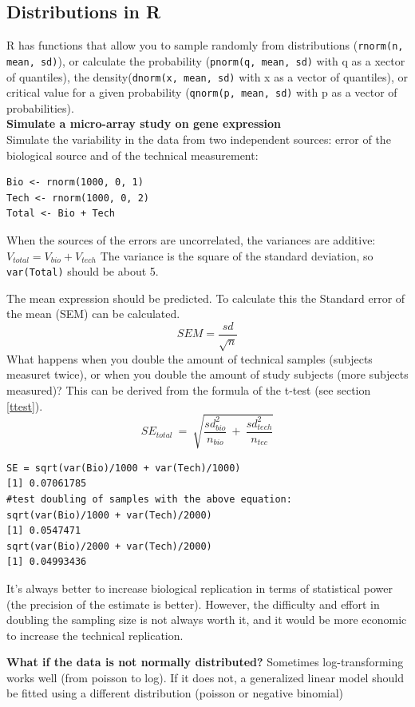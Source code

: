 \documentclass{article}
\begin{document}
\subsection{Distributions in R}
R has functions that allow you to sample randomly from distributions (\texttt{rnorm(n, mean, sd)}), or calculate the probability (\texttt{pnorm(q, mean, sd)} with q as a xector of quantiles), the density(\texttt{dnorm(x, mean, sd)} with x as a vector of quantiles), or critical value for a given probability (\texttt{qnorm(p, mean, sd)} with p as a vector of probabilities).\\
\textbf{Simulate a micro-array study on gene expression}\\
Simulate the variability in the data from two independent sources: error of the biological source and of the technical measurement:
\begin{lstlisting}
Bio <- rnorm(1000, 0, 1)
Tech <- rnorm(1000, 0, 2)
Total <- Bio + Tech
\end{lstlisting}
When the sources of the errors are uncorrelated, the variances are additive: $V_{total} = V_{bio} +V_{tech}$
The variance is the square of the standard deviation, so \texttt{var(Total)} should be about 5.\par
The mean expression should be predicted. To calculate this the Standard error of the mean (SEM) can be calculated. $$SEM = \frac{sd}{\sqrt{n}}$$
What happens when you double the amount of technical samples (subjects measuret twice), or when you double the amount of study subjects (more subjects measured)? This can be derived from the formula of the t-test (see section \ref{ttest}). 
$$SE_{total}\: = \:\sqrt{\frac{sd_{bio}^2}{n_{bio}} \: + \: \frac{sd_{tech}^2}{n_{tec}}} $$
\begin{lstlisting}
SE = sqrt(var(Bio)/1000 + var(Tech)/1000)
[1] 0.07061785
#test doubling of samples with the above equation:
sqrt(var(Bio)/1000 + var(Tech)/2000)
[1] 0.0547471
sqrt(var(Bio)/2000 + var(Tech)/2000)
[1] 0.04993436
\end{lstlisting}
It's always better to increase biological replication in terms of statistical power (the precision of the estimate is better). However, the difficulty and effort in doubling the sampling size is not always worth it, and it would be more economic to increase the technical replication.\par
\textbf{What if the data is not normally distributed?} Sometimes log-transforming works well (from poisson to log). If it does not, a generalized linear model should be fitted using a different distribution (poisson or negative binomial)
\end{document}
